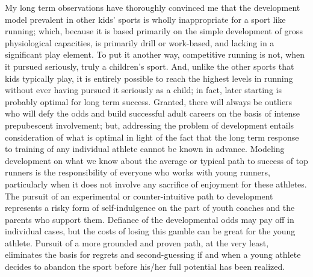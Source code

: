 My long term observations have thoroughly convinced me that the development model prevalent in other kids' sports is wholly inappropriate for a sport like running; which, because it is based primarily on the simple development of gross physiological capacities, is primarily drill or work-based, and lacking in a significant play element. To put it another way, competitive running is not, when it pursued seriously, truly a children's sport. And, unlike the other sports that kids typically play, it is entirely possible to reach the highest levels in running without ever having pursued it seriously as a child; in fact, later starting is probably optimal for long term success. Granted, there will always be outliers who will defy the odds and build successful adult careers on the basis of intense prepubescent involvement; but, addressing the problem of development entails consideration of what is optimal in light of the fact that the long term response to training of any individual athlete cannot be known in advance. Modeling development on what we know about the average or typical path to success of top runners is the responsibility of everyone who works with young runners, particularly when it does not involve any sacrifice of enjoyment for these athletes. The pursuit of an experimental or counter-intuitive path to development represents a risky form of self-indulgence on the part of youth coaches and the parents who support them. Defiance of the developmental odds may pay off in individual cases, but the costs of losing this gamble can be great for the young athlete. Pursuit of a more grounded and proven path, at the very least, eliminates the basis for regrets and second-guessing if and when a young athlete decides to abandon the sport before his/her full potential has been realized.




